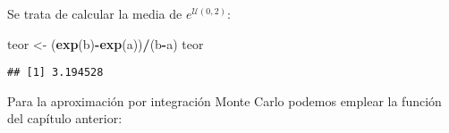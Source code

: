\documentclass[
]{book}
\newenvironment{Shaded}{\begin{snugshade}}{\end{snugshade}}
\newcommand{\KeywordTok}[1]{\textcolor[rgb]{0.13,0.29,0.53}{\textbf{#1}}}
\newcommand{\NormalTok}[1]{#1}
\newcommand{\OperatorTok}[1]{\textcolor[rgb]{0.81,0.36,0.00}{\textbf{#1}}}
\newcommand{\StringTok}[1]{\textcolor[rgb]{0.31,0.60,0.02}{#1}}
\theoremstyle{break}
\theoremstyle{definition}
\theoremstyle{definition}
\theoremstyle{definition}
\theoremstyle{remark}
\begin{document}
Se trata de calcular la media de \(e^{\mathcal{U}(0,2)}\):

\begin{Shaded}
\begin{Highlighting}[]
\NormalTok{teor <-}\StringTok{ }\NormalTok{(}\KeywordTok{exp}\NormalTok{(b)}\OperatorTok{-}\KeywordTok{exp}\NormalTok{(a))}\OperatorTok{/}\NormalTok{(b}\OperatorTok{-}\NormalTok{a)}
\NormalTok{teor}
\end{Highlighting}
\end{Shaded}

\begin{verbatim}
## [1] 3.194528
\end{verbatim}

Para la aproximación por integración Monte Carlo podemos emplear la función del capítulo anterior:
\end{document}
